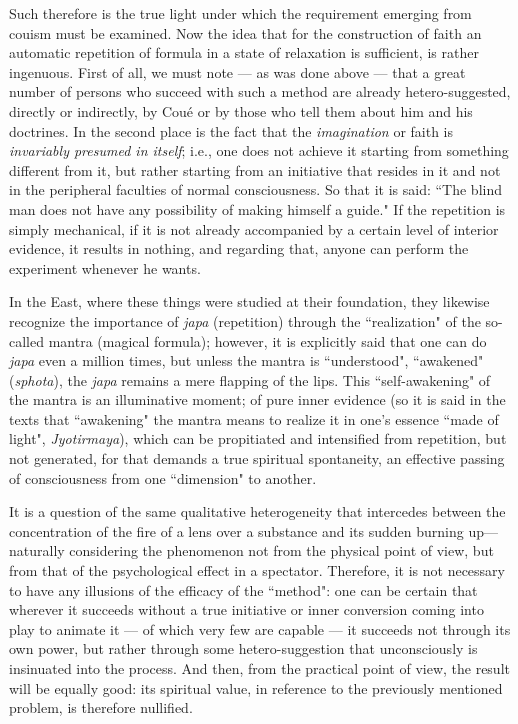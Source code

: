 Such therefore is the true light under which the requirement emerging from couism must be examined. Now the idea that for the construction of faith an automatic repetition of formula in a state of relaxation is sufficient, is rather ingenuous. First of all, we must note — as was done above — that a great number of persons who succeed with such a method are already hetero-suggested, directly or indirectly, by Coué or by those who tell them about him and his doctrines. In the second place is the fact that the \textit{imagination} or faith is \textit{invariably presumed in itself}; i.e., one does not achieve it starting from something different from it, but rather starting from an initiative that resides in it and not in the peripheral faculties of normal consciousness. So that it is said: ``The blind man does not have any possibility of making himself a guide." If the repetition is simply mechanical, if it is not already accompanied by a certain level of interior evidence, it results in nothing, and regarding that, anyone can perform the experiment whenever he wants.

In the East, where these things were studied at their foundation, they likewise recognize the importance of \textit{japa} (repetition) through the ``realization" of the so-called mantra (magical formula); however, it is explicitly said that one can do \textit{japa} even a million times, but unless the mantra is ``understood", ``awakened" (\textit{sphota}), the \textit{japa} remains a mere flapping of the lips. This ``self-awakening" of the mantra is an illuminative moment; of pure inner evidence (so it is said in the texts that ``awakening" the mantra means to realize it in one's essence ``made of light", \textit{Jyotirmaya}), which can be propitiated and intensified from repetition, but not generated, for that demands a true spiritual spontaneity, an effective passing of consciousness from one ``dimension" to another.

It is a question of the same qualitative heterogeneity that intercedes between the concentration of the fire of a lens over a substance and its sudden burning up—naturally considering the phenomenon not from the physical point of view, but from that of the psychological effect in a spectator. Therefore, it is not necessary to have any illusions of the efficacy of the ``method": one can be certain that wherever it succeeds without a true initiative or inner conversion coming into play to animate it — of which very few are capable — it succeeds not through its own power, but rather through some hetero-suggestion that unconsciously is insinuated into the process. And then, from the practical point of view, the result will be equally good: its spiritual value, in reference to the previously mentioned problem, is therefore nullified.


